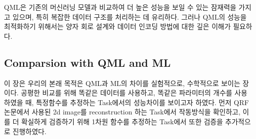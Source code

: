 QML은 기존의 머신러닝 모델과 비교하여 더 높은 성능을 보일 수 있는 잠재력을 가지고 있으며, 특히 복잡한 데이터 구조를 처리하는 데 유리하다. 그러나 QML의 성능을 최적화하기 위해서는 양자 회로 설계와 데이터 인코딩 방법에 대한 깊은 이해가 필요하다.

\subsection{Comparsion with QML and ML}

이 장은 우리의 본래 목적은 QML과 ML의 차이를 실험적으로, 수학적으로 보이는 장이다. 공평한 비교를 위해 똑같은 데이터를 사용하고, 똑같은 파라미터의 개수를 사용하였을 때, 특정함수를 추정하는 Task에서의 성능차이를 보이고자 하였다. 먼저 QRF논문에서 사용된 2d image를 reconstruction 하는 Task에서 작동방식을 확인하고, 이를 더 확실하게 검증하기 위해 1차원 함수를 추정하는 Task에서 또한 검증을 추가적으로 진행하였다.

